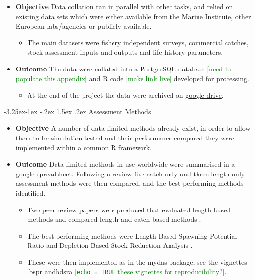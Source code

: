 \documentclass[a4paper, 10pt]{article}
\makeatletter
\newcommand{\coilin}{\textcolor{green}}
\renewcommand{\subsection}{\@startsection{subsection}{2}{\z@}%
 {-3.25ex\@plus -1ex \@minus -.2ex}%
 {1.5ex \@plus .2ex}%
 {\normalfont\bfseries\slshape}}
\makeatother
\begin{document}
\begin{itemize}[labelindent=\parindent,noitemsep,topsep=0pt,parsep=0pt,partopsep=0pt]
 \item \textbf{Objective} Data collation ran in parallel with other tasks, and relied on existing data sets which were either available from the Marine Institute, other European labs/agencies or publicly available. 
 \begin{itemize} \item The main datasets were fishery independent surveys, commercial catches, stock assessment inputs and outputs and life history parameters.
 \end{itemize}
 \item \textbf{Outcome} The data were collated into a PostgreSQL \hyperref[appendix:db]{database} \coilin{[need to populate this appendix]} and  \hyperref[appendix:datasets]{R code} \coilin{[make link live]} developed for processing. 
 \begin{itemize}
    \item At the end of the project the data were archived on \href{https://3o2y9wugzp1kfxr5hvzgzq-on.drv.tw/MyDas/db.html}{google drive}.
 \end{itemize}
\end{itemize}

\subsection{Assessment Methods}

\begin{itemize}[labelindent=\parindent,noitemsep,topsep=0pt,parsep=0pt,partopsep=0pt]
 \item \textbf{Objective} A number of data limited methods already exist, in order to allow them to be simulation tested and their performance compared they were implemented within a common R framework.    
 \item \textbf{Outcome} Data limited methods in use worldwide were summarised in a \href{https://docs.google.com/spreadsheets/d/17_qQdzDY41ZrL0yT6QtHpUR4_ydxx_xfCh4GiDqYymU/edit?usp=sharing}{google spreadsheet}. Following a review five catch-only and three length-only assessment methods were then compared, and the best performing methods identified.  
 \begin{itemize}
 \item Two peer review papers were produced that evaluated length based methods \citep{pons2019performance} and compared length and catch based methods \citep{pons2019catchlen}.
 \item  The best performing methods were Length Based Spawning Potential Ratio \citep[LBSPR][]{hordyk2014novel} and Depletion Based  Stock Reduction Analysis \citep[DBSRA][]{dick2011depletion}. 
 \item These were then implemented as in the mydas package, see the vignettes \href{https://3o2y9wugzp1kfxr5hvzgzq-on.drv.tw/MyDas/tasks/4/simtest-lbspr.html}{lbspr} and\href{https://3o2y9wugzp1kfxr5hvzgzq-on.drv.tw/MyDas/tasks/4/simtest-bdsra.html}{bdsra} \coilin{[\texttt{echo = TRUE} these vignettes for reproducibility?]}.
 \end{itemize}
\end{itemize}
\end{document}
